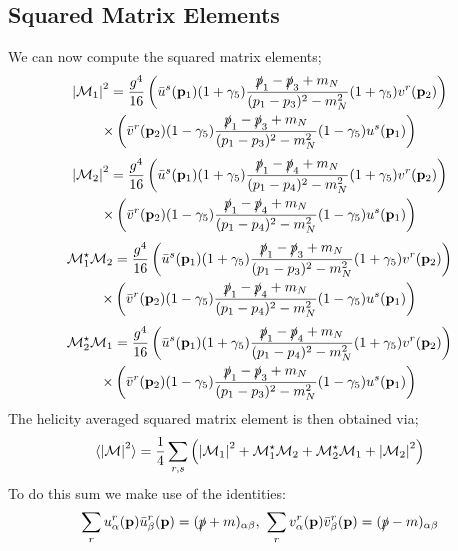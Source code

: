 \documentclass[10pt]{article}
\begin{document}
\subsection{Squared Matrix Elements}
We can now compute the squared matrix elements;
\begin{multline*}
\left|\mM_1\right|^2 = \frac{g^4}{16}\left(\bar{u}^{s}(\vec{p}_1)(1 + \gamma_5)\frac{\slashed{p}_1 - \slashed{p}_3 + m_N}{(p_1 - p_3)^2 - m_N^2}(1 + \gamma_5)v^{r}(\vec{p}_2)\right) \\ \times \left(\bar{v}^r(\vec{p}_2)(1 - \gamma_5)\frac{\slashed{p}_1 - \slashed{p}_3 + m_N}{(p_1 - p_3)^2 - m_N^2}(1 - \gamma_5)u^s(\vec{p}_1) \right)
\end{multline*}
\begin{multline*}
\left|\mM_2\right|^2 = \frac{g^4}{16}\left(\bar{u}^{s}(\vec{p}_1)(1 + \gamma_5)\frac{\slashed{p}_1 - \slashed{p}_4 + m_N}{(p_1 - p_4)^2 - m_N^2}(1 + \gamma_5)v^{r}(\vec{p}_2)\right) \\ \times\left(\bar{v}^r(\vec{p}_2)(1 - \gamma_5)\frac{\slashed{p}_1 - \slashed{p}_4 + m_N}{(p_1 - p_4)^2 - m_N^2}(1 - \gamma_5)u^s(\vec{p}_1) \right)
\end{multline*}
\begin{multline*}
\mM_1^\star \mM_2 = \frac{g^4}{16}\left(\bar{u}^{s}(\vec{p}_1)(1 + \gamma_5)\frac{\slashed{p}_1 - \slashed{p}_3 + m_N}{(p_1 - p_3)^2 - m_N^2}(1 + \gamma_5)v^{r}(\vec{p}_2)\right) \\ \times\left(\bar{v}^r(\vec{p}_2)(1 - \gamma_5)\frac{\slashed{p}_1 - \slashed{p}_4 + m_N}{(p_1 - p_4)^2 - m_N^2}(1 - \gamma_5)u^s(\vec{p}_1) \right)
\end{multline*}
\begin{multline*}
\mM_2^\star \mM_1 = \frac{g^4}{16}\left(\bar{u}^{s}(\vec{p}_1)(1 + \gamma_5)\frac{\slashed{p}_1 - \slashed{p}_4 + m_N}{(p_1 - p_4)^2 - m_N^2}(1 + \gamma_5)v^{r}(\vec{p}_2)\right) \\ \times\left(\bar{v}^r(\vec{p}_2)(1 - \gamma_5)\frac{\slashed{p}_1 - \slashed{p}_3 + m_N}{(p_1 - p_3)^2 - m_N^2}(1 - \gamma_5)u^s(\vec{p}_1) \right)
\end{multline*}
The helicity averaged squared matrix element is then obtained via;
\begin{equation*}
\langle \Abs{\mM}^2 \rangle = \frac{1}{4}\sum_{r, s}{\left(\Abs{\mM_1}^2 + \mM_1^\star \mM_2 + \mM_2^\star \mM_1 + \Abs{\mM_2}^2\right)}
\end{equation*}
To do this sum we make use of the identities:
\begin{equation}
\sum_{r}{u_\alpha^r(\vec{p})\bar{u}_\beta^r(\vec{p})} = (\slashed{p} + m)_{\alpha \beta}, \,\, \sum_{r}{v_\alpha^r(\vec{p})\bar{v}_\beta^r(\vec{p})} = (\slashed{p} - m)_{\alpha \beta}
\end{equation}
\end{document}
